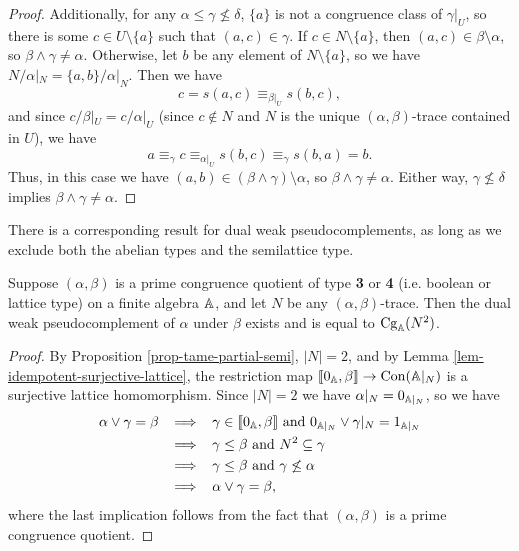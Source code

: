 \begin{appendices}
\begin{proof}
Additionally, for any $\alpha \le \gamma \not\le \delta$, $\{a\}$ is not a congruence class of $\gamma|_U$, so there is some $c \in U \setminus \{a\}$ such that $(a,c) \in \gamma$. If $c \in N \setminus \{a\}$, then $(a,c) \in \beta \setminus \alpha$, so $\beta \wedge \gamma \ne \alpha$. Otherwise, let $b$ be any element of $N \setminus \{a\}$, so we have $N/\alpha|_N = \{a,b\}/\alpha|_N$. Then we have
\[
c = s(a,c) \equiv_{\beta|_U} s(b,c),
\]
and since $c/\beta|_U = c/\alpha|_U$ (since $c \not\in N$ and $N$ is the unique $(\alpha,\beta)$-trace contained in $U$), we have
\[
a \equiv_\gamma c \equiv_{\alpha|_U} s(b,c) \equiv_\gamma s(b,a) = b.
\]
Thus, in this case we have $(a,b) \in (\beta \wedge \gamma) \setminus \alpha$, so $\beta \wedge \gamma \ne \alpha$. Either way, $\gamma \not\le \delta$ implies $\beta \wedge \gamma \ne \alpha$.
\end{proof}

There is a corresponding result for dual weak pseudocomplements, as long as we exclude both the abelian types and the semilattice type.

\begin{prop}\label{prop-dual-weak-pseudo} Suppose $(\alpha,\beta)$ is a prime congruence quotient of type \textbf{3} or \textbf{4} (i.e. boolean or lattice type) on a finite algebra $\mathbb{A}$, and let $N$ be any $(\alpha,\beta)$-trace. Then the dual weak pseudocomplement of $\alpha$ under $\beta$ exists and is equal to $\operatorname{Cg}_{\mathbb{A}}(N^2)$.
\end{prop}
\begin{proof} By Proposition \ref{prop-tame-partial-semi}, $|N| = 2$, and by Lemma \ref{lem-idempotent-surjective-lattice}, the restriction map $\llbracket 0_{\mathbb{A}}, \beta \rrbracket \rightarrow \operatorname{Con}(\mathbb{A}|_N)$ is a surjective lattice homomorphism. Since $|N| = 2$ we have $\alpha|_N = 0_{\mathbb{A}|_N}$, so we have
\begin{align*}
\alpha \vee \gamma = \beta \;\; &\implies \;\; \gamma \in \llbracket 0_{\mathbb{A}}, \beta \rrbracket \text{ and } 0_{\mathbb{A}|_N} \vee \gamma|_N = 1_{\mathbb{A}|_N}\\
&\implies \;\; \gamma \le \beta \text{ and } N^2 \subseteq \gamma\\
&\implies \;\; \gamma \le \beta \text{ and } \gamma \not\le \alpha\\
&\implies \;\; \alpha \vee \gamma = \beta,
\end{align*}
where the last implication follows from the fact that $(\alpha,\beta)$ is a prime congruence quotient.
\end{proof}


\end{appendices}

